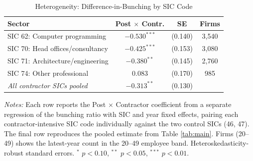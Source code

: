 \begin{table}[htbp]
\centering
\caption{Heterogeneity: Difference-in-Bunching by SIC Code}
\label{tab:sic}
\small
\begin{tabular}{lccc}
\hline\hline
Sector & Post $\times$ Contr. & SE & Firms \\
\hline
SIC 62: Computer programming & $-0.530^{***}$ & (0.140) & 3,540 \\
SIC 70: Head offices/consultancy & $-0.425^{***}$ & (0.153) & 3,080 \\
SIC 71: Architecture/engineering & $-0.380^{**}$ & (0.145) & 2,760 \\
SIC 74: Other professional & $0.083$ & (0.170) & 985 \\
\hline
\textit{All contractor SICs pooled} & $-0.313^{**}$ & (0.130) & \\
\hline\hline
\end{tabular}
\begin{tablenotes}
\item \textit{Notes:} Each row reports the Post $\times$ Contractor coefficient from a separate regression of the bunching ratio with SIC and year fixed effects, pairing each contractor-intensive SIC code individually against the two control SICs (46, 47). The final row reproduces the pooled estimate from Table \ref{tab:main}. Firms (20--49) shows the latest-year count in the 20--49 employee band. Heteroskedasticity-robust standard errors. $^{*}$ $p<0.10$, $^{**}$ $p<0.05$, $^{***}$ $p<0.01$.
\end{tablenotes}
\end{table}
